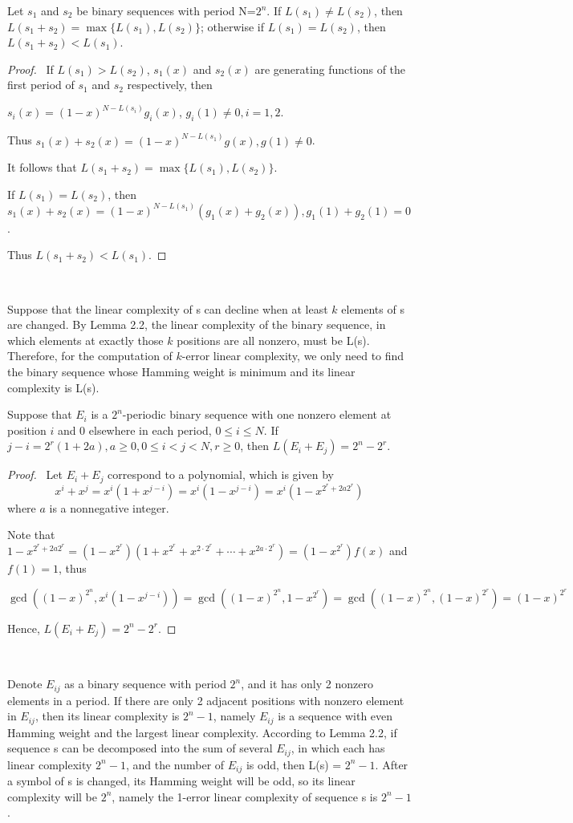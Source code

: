 \documentclass[10pt,conference,twocolumn]{IEEEtran}
\begin{document}
  Let $s_1$ and $s_2$ be binary sequences
with period N=$2^n$. If $L(s_1)\ne L(s_2)$, then
$L(s_1+s_2)=\max\{L(s_1),L(s_2)\} $; otherwise if $L(s_1)= L(s_2)$,
then $L(s_1+s_2)<L(s_1)$.

\begin{proof}\
 If  $L(s_1)> L(s_2)$, $s_1(x)$ and $s_2(x)$ are  generating functions of the first period of $s_1$ and $s_2$
  respectively, then

 $s_i(x)=(1-x)^{N-L(s_i)}g_i(x)$, $g_i(1)\ne0, i=1,2$.

Thus $s_1(x)+s_2(x)=(1-x)^{N-L(s_1)}g(x), g(1)\ne0$.

It follows that $L(s_1+s_2)=\max\{L(s_1),L(s_2)\}$.

If $L(s_1)= L(s_2)$, then
$s_1(x)+s_2(x)=(1-x)^{N-L(s_1)}(g_1(x)+g_2(x)), g_1(1)+g_2(1)=0$.

Thus $L(s_1+s_2)<L(s_1)$.
\end{proof}\

Suppose that the linear complexity of s can decline when at least
$k$ elements of s are changed. By Lemma 2.2, the linear complexity
of the binary sequence, in which elements at exactly those $k$
positions are all nonzero, must be L(s). Therefore, for the
computation of $k$-error linear complexity, we only need to find the
binary sequence whose Hamming weight is minimum and its linear
complexity is L(s).


 Suppose that $E_i$ is a $2^n$-periodic
binary sequence  with one nonzero element at position $i$ and 0
elsewhere in each period, $0\le i\le N$. If $j-i=2^r(1+2a), a\ge0,
0\le i<j<N, r\ge0$, then $L(E_i +E_j)=2^n-2^r$.


\begin{proof}\
Let $E_i +E_j$ correspond to a polynomial, which is given by
$$x^i+x^j=x^i(1+x^{j-i})=x^i(1-x^{j-i})=x^i(1-x^{2^r+2a2^r})$$ where
$a$ is a nonnegative integer.

Note that $1-x^{2^r+2a2^r}=(1-x^{2^r})(1+x^{2^r}+x^{2\cdot2^r}
+\cdots+  x^{2a\cdot2^r})=(1-x^{2^r})f(x)$ and $f(1)=1$, thus

$\gcd((1-x)^{2^n},x^i(1-x^{j-i}))=\gcd((1-x)^{2^n},1-x^{2^r})=\gcd((1-x)^{2^n},(1-x)^{2^r})=(1-x)^{2^r}$

Hence, $L(E_i +E_j)=2^n-2^r$.
\end{proof}\

Denote $E_{ij}$ as a binary sequence with period $2^n$, and it has
only 2 nonzero elements in a period. If there are only 2 adjacent
positions with nonzero element  in $E_{ij}$, then its linear
complexity is $2^n-1$, namely $E_{ij}$ is a sequence with even
Hamming weight and the largest linear complexity. According to Lemma
2.2, if sequence s can be decomposed into the sum of several
$E_{ij}$, in which each has linear complexity  $2^n-1$, and the
number of $E_{ij}$ is odd, then L(s) = $2^n-1$. After a symbol of s
is changed, its Hamming weight will be odd, so its linear complexity
will be $2^n$, namely the 1-error linear complexity of sequence s is
$2^n-1$.
\end{document}
